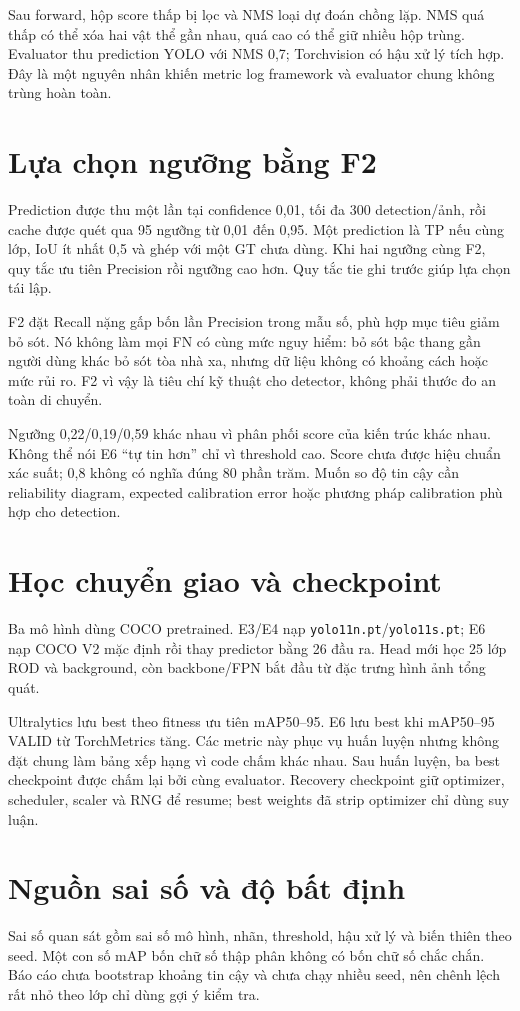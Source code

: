 \documentclass[12pt,a4paper,oneside]{report}
\begin{document}
Sau forward, hộp score thấp bị lọc và NMS loại dự đoán chồng lặp. NMS quá thấp có thể xóa hai vật thể gần nhau, quá cao có thể giữ nhiều hộp trùng. Evaluator thu prediction YOLO với NMS 0,7; Torchvision có hậu xử lý tích hợp. Đây là một nguyên nhân khiến metric log framework và evaluator chung không trùng hoàn toàn.

\section{Lựa chọn ngưỡng bằng F2}
Prediction được thu một lần tại confidence 0,01, tối đa 300 detection/ảnh, rồi cache được quét qua 95 ngưỡng từ 0,01 đến 0,95. Một prediction là TP nếu cùng lớp, IoU ít nhất 0,5 và ghép với một GT chưa dùng. Khi hai ngưỡng cùng F2, quy tắc ưu tiên Precision rồi ngưỡng cao hơn. Quy tắc tie ghi trước giúp lựa chọn tái lập.

F2 đặt Recall nặng gấp bốn lần Precision trong mẫu số, phù hợp mục tiêu giảm bỏ sót. Nó không làm mọi FN có cùng mức nguy hiểm: bỏ sót bậc thang gần người dùng khác bỏ sót tòa nhà xa, nhưng dữ liệu không có khoảng cách hoặc mức rủi ro. F2 vì vậy là tiêu chí kỹ thuật cho detector, không phải thước đo an toàn di chuyển.

Ngưỡng 0,22/0,19/0,59 khác nhau vì phân phối score của kiến trúc khác nhau. Không thể nói E6 “tự tin hơn” chỉ vì threshold cao. Score chưa được hiệu chuẩn xác suất; 0,8 không có nghĩa đúng 80 phần trăm. Muốn so độ tin cậy cần reliability diagram, expected calibration error hoặc phương pháp calibration phù hợp cho detection.

\section{Học chuyển giao và checkpoint}
Ba mô hình dùng COCO pretrained. E3/E4 nạp \texttt{yolo11n.pt}/\texttt{yolo11s.pt}; E6 nạp COCO V2 mặc định rồi thay predictor bằng 26 đầu ra. Head mới học 25 lớp ROD và background, còn backbone/FPN bắt đầu từ đặc trưng hình ảnh tổng quát.

Ultralytics lưu best theo fitness ưu tiên mAP50--95. E6 lưu best khi mAP50--95 VALID từ TorchMetrics tăng. Các metric này phục vụ huấn luyện nhưng không đặt chung làm bảng xếp hạng vì code chấm khác nhau. Sau huấn luyện, ba best checkpoint được chấm lại bởi cùng evaluator. Recovery checkpoint giữ optimizer, scheduler, scaler và RNG để resume; best weights đã strip optimizer chỉ dùng suy luận.

\section{Nguồn sai số và độ bất định}
Sai số quan sát gồm sai số mô hình, nhãn, threshold, hậu xử lý và biến thiên theo seed. Một con số mAP bốn chữ số thập phân không có bốn chữ số chắc chắn. Báo cáo chưa bootstrap khoảng tin cậy và chưa chạy nhiều seed, nên chênh lệch rất nhỏ theo lớp chỉ dùng gợi ý kiểm tra.
\end{document}
